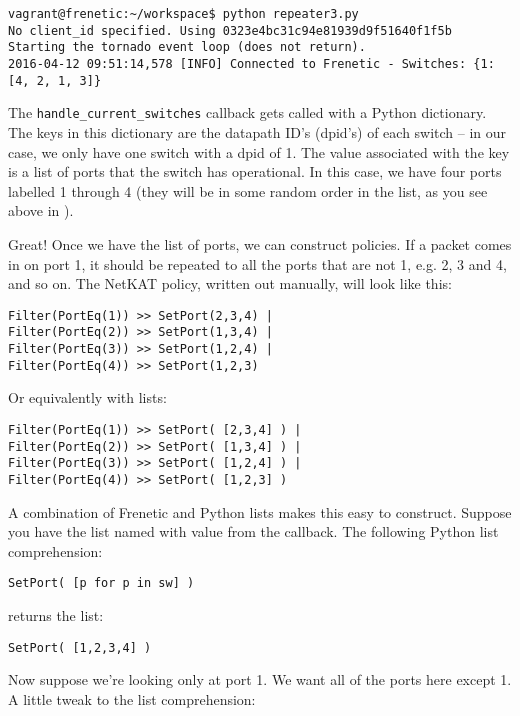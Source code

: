 \begin{verbatim}
vagrant@frenetic:~/workspace$ python repeater3.py
No client_id specified. Using 0323e4bc31c94e81939d9f51640f1f5b
Starting the tornado event loop (does not return).
2016-04-12 09:51:14,578 [INFO] Connected to Frenetic - Switches: {1: [4, 2, 1, 3]}
\end{verbatim}

The \texttt{handle\_current\_switches} callback gets called with a Python dictionary.  
The keys in this dictionary are the datapath ID's (dpid's) of each switch -- in our case, we only have
one switch with a dpid of 1.
The value associated with the key is a list of ports that the switch has operational.  
In this case, we have four ports labelled 1 through 4 (they will be in some random order in the list, as
you see above in \python{[4, 2, 1, 3]}).

Great!  Once we have the list of ports, we can construct policies.  If a packet comes in on port
1, it should be repeated to all the ports that are not 1, e.g. 2, 3 and 4, and so on.   
The NetKAT policy, written out manually, will look like this:

\begin{verbatim}
Filter(PortEq(1)) >> SetPort(2,3,4) |
Filter(PortEq(2)) >> SetPort(1,3,4) |
Filter(PortEq(3)) >> SetPort(1,2,4) |
Filter(PortEq(4)) >> SetPort(1,2,3)
\end{verbatim}

Or equivalently with lists:

\begin{verbatim}
Filter(PortEq(1)) >> SetPort( [2,3,4] ) |
Filter(PortEq(2)) >> SetPort( [1,3,4] ) |
Filter(PortEq(3)) >> SetPort( [1,2,4] ) |
Filter(PortEq(4)) >> SetPort( [1,2,3] )
\end{verbatim}

A combination of Frenetic and Python lists makes this easy to construct.  
Suppose you have the list named  with value 
\python{[1, 2, 3, 4]} from the callback.   The following Python list comprehension:

\begin{verbatim}
SetPort( [p for p in sw] )
\end{verbatim}

returns the list:

\begin{verbatim}
SetPort( [1,2,3,4] )
\end{verbatim}

Now suppose we're looking only at port 1.  We want all of the ports here 
except 1.  A little tweak to the list comprehension:

